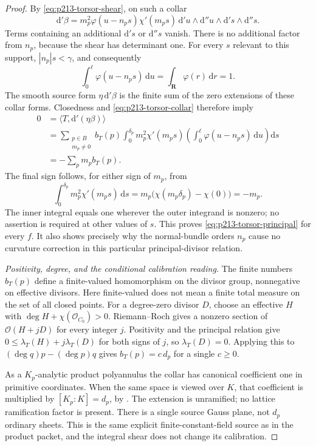 \begin{proof}
By \eqref{eq:p213-torsor-shear}, on such a collar
\begin{equation}
\label{eq:p213-torsor-top-shear}
 \mathrm d'\beta=
 m_p^2\varphi(u-n_ps)\chi'(m_ps)\,
    \mathrm d'u\wedge\mathrm d''u\wedge
                     \mathrm d's\wedge\mathrm d''s.
\end{equation}
Terms containing an additional \(\mathrm d's\) or
\(\mathrm d''s\) vanish. There is no additional
factor from \(n_p\), because the shear has determinant
one. For every \(s\) relevant to this support,
\(|n_p|s<\gamma\), and consequently
\[
 \int_0^\ell\varphi(u-n_ps)\,\mathrm du
       =\int_{\mathbf R}\varphi(r)\,\mathrm dr=1.
\]
The smooth source form \(\eta\,\mathrm d'\beta\)
is the finite sum of the zero extensions of these
collar forms. Closedness and \eqref{eq:p213-torsor-collar}
therefore imply
\[
 \begin{split}
 0&=\langle T,\mathrm d'(\eta\beta)\rangle\\
  &=\sum_{\substack{p\in B\\m_p\neq0}} b_T(p)
       \int_0^{\delta_p}m_p^2\chi'(m_ps)
           \left(\int_0^\ell\varphi(u-n_ps)\,\mathrm du\right)
                      \mathrm ds\\
  &=-\sum_p m_pb_T(p).
 \end{split}
\]
The final sign follows, for either sign of \(m_p\), from
\[
 \int_0^{\delta_p}m_p^2\chi'(m_ps)\,\mathrm ds
   =m_p\bigl(\chi(m_p\delta_p)-\chi(0)\bigr)=-m_p.
\]
The inner integral equals one wherever the outer
integrand is nonzero; no assertion is required at
other values of \(s\). This proves
\eqref{eq:p213-torsor-principal} for every \(f\).
It also shows precisely why the normal-bundle orders
\(n_p\) cause no curvature correction in this particular
principal-divisor relation.

\emph{Positivity, degree, and the conditional calibration reading.}
The finite numbers \(b_T(p)\) define a finite-valued
homomorphism on the divisor group, nonnegative on
effective divisors. Here finite-valued does not mean
a finite total measure on the set of all closed points.
For a degree-zero divisor \(D\), choose an effective
\(H\) with \(\deg H+\chi(\mathcal O_{C_0})>0\).
Riemann--Roch gives a nonzero section of
\(\mathcal O(H+jD)\) for every integer \(j\).
Positivity and the principal relation give
\(0\leq\lambda_T(H)+j\lambda_T(D)\) for both signs
of \(j\), so \(\lambda_T(D)=0\).
Applying this to \((\deg q)p-(\deg p)q\) gives
\(b_T(p)=c\,d_p\) for a single \(c\geq0\).

As a \(K_p\)-analytic product polyannulus the collar
has canonical coefficient one in primitive coordinates.
When the same space is viewed over \(K\), that coefficient
is multiplied by \([K_p:K]=d_p\), by
\cite[Remark 14.4.3, p.~410]{CLD25}.
The extension is unramified; no lattice ramification
factor is present. There is a single source Gauss plane,
not \(d_p\) ordinary sheets. This is the same explicit
finite-constant-field source as in the product packet,
and the integral shear does not change its calibration.


\end{proof}
